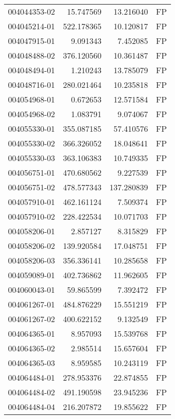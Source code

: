 \begin{tabular}{lrrl}
004044353-02 &   15.747569 &      13.216040 &   FP \\
004045214-01 &  522.178365 &      10.120817 &   FP \\
004047915-01 &    9.091343 &       7.452085 &   FP \\
004048488-02 &  376.120560 &      10.361487 &   FP \\
004048494-01 &    1.210243 &      13.785079 &   FP \\
004048716-01 &  280.021464 &      10.235818 &   FP \\
004054968-01 &    0.672653 &      12.571584 &   FP \\
004054968-02 &    1.083791 &       9.074067 &   FP \\
004055330-01 &  355.087185 &      57.410576 &   FP \\
004055330-02 &  366.326052 &      18.048641 &   FP \\
004055330-03 &  363.106383 &      10.749335 &   FP \\
004056751-01 &  470.680562 &       9.227539 &   FP \\
004056751-02 &  478.577343 &     137.280839 &   FP \\
004057910-01 &  462.161124 &       7.509374 &   FP \\
004057910-02 &  228.422534 &      10.071703 &   FP \\
004058206-01 &    2.857127 &       8.315829 &   FP \\
004058206-02 &  139.920584 &      17.048751 &   FP \\
004058206-03 &  356.336141 &      10.285658 &   FP \\
004059089-01 &  402.736862 &      11.962605 &   FP \\
004060043-01 &   59.865599 &       7.392472 &   FP \\
004061267-01 &  484.876229 &      15.551219 &   FP \\
004061267-02 &  400.622152 &       9.132549 &   FP \\
004064365-01 &    8.957093 &      15.539768 &   FP \\
004064365-02 &    2.985514 &      15.657604 &   FP \\
004064365-03 &    8.959585 &      10.243119 &   FP \\
004064484-01 &  278.953376 &      22.874855 &   FP \\
004064484-02 &  491.190598 &      23.945236 &   FP \\
004064484-04 &  216.207872 &      19.855622 &   FP \\

\end{tabular}

